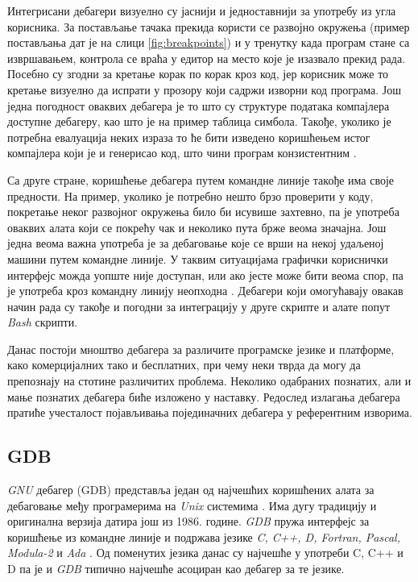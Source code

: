 \documentclass[a4paper]{article}
\begin{document}
Интегрисани дебагери визуелно су јаснији и једноставнији за употребу из угла корисника.
За постављање тачака прекида користи се развојно окружења
(пример постављања дат је на слици \ref{fig:breakpoints}) и у тренутку 
када програм стане са извршавањем,
контрола се враћа у едитор на место које је изазвало прекид рада.
Посебно су згодни за кретање корак по корак кроз код,
јер корисник може то кретање визуелно да испрати у прозору који садржи 
изворни код програма.
Још једна погодност оваквих дебагера је то што су структуре података
компајлера доступне дебагеру, као што је на пример таблица симбола. 
Такође, уколико је потребна евалуација неких израза то ће бити 
изведено коришћењем истог компајлера који је и генерисао код, што чини 
програм конзистентним \cite{debuggersForProgrammingLanguages}.

Са друге стране, коришћење дебагера путем командне линије такође има 
своје предности. На пример, уколико је потребно нешто брзо проверити
у коду, покретање неког развојног окружења било би исувише захтевно,
па је употреба оваквих алата који се покрећу чак и неколико пута брже 
веома значајна. Још једна веома важна употреба је за дебаговање које
се врши на некој удаљеној машини путем командне линије.
У таквим ситуацијама графички кориснички интерфејс можда уопште није 
доступан, или ако јесте може бити веома спор, па је употреба кроз 
командну линију неопходна \cite{artOfDebugging}. Дебагери који омогућавају
овакав начин рада су такође и погодни за интеграцију у друге скрипте и алате
попут {\em Bash} скрипти.

Данас постоји мноштво дебагера за различите програмске језике и платформе, 
како комерцијалних тако и бесплатних, при чему неки тврда да могу 
да препознају на стотине различитих проблема.
Неколико одабраних познатих, али и мање познатих дебагера биће изложено у наставку.
Редослед излагања дебагера пратиће учесталост појављивања појединачних
дебагера у референтним изворима.

\subsection{GDB}
\label{sec:gdb}

{\em GNU} дебагер (GDB) представља један од најчешћих коришћених алата за дебаговање међу
програмерима на {\em Unix} системима \cite{artOfDebugging}. Има дугу традицију и оригинална
верзија датира још из 1986. године.
{\em GDB} пружа интерфејс за коришћење из командне линије и подржава језике
{\em C, C++, D, Fortran, Pascal, Modula-2} и {\em Ada} \cite{gdb}.
Од поменутих језика данас су најчешће у употреби C, C++ и D
па је и {\em GDB} типично најчешће асоциран као дебагер за те језике.
\end{document}
